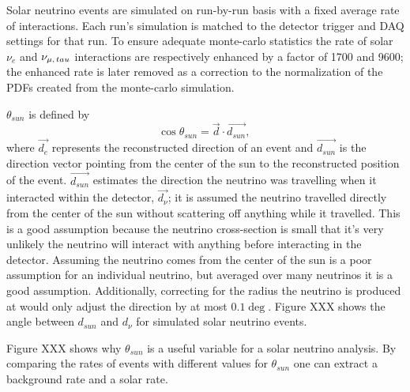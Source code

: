 Solar neutrino events are simulated on run-by-run basis with a fixed average rate
of interactions.
Each run's simulation is matched to the detector trigger and
DAQ settings for that run.
To ensure adequate monte-carlo statistics the rate of solar $\nu_{e}$ and
$\nu_{\mu\text{,\,}tau}$ interactions are respectively enhanced by a factor of
1700 and 9600;
the enhanced rate is later removed as a correction
to the normalization of the PDFs created from the monte-carlo simulation.

$\theta_{sun}$ is defined by
\begin{equation}
\cos\theta_{sun} = \vec{d}\cdot\vec{d_{sun}}\text{, }
\end{equation}
where $\vec{d_{e}}$ represents the reconstructed direction of an event and
$\vec{d_{sun}}$ is the direction vector pointing from the center of the sun to
the reconstructed position of the event.
$\vec{d_{sun}}$ estimates the direction the neutrino was travelling when it interacted
within the detector, $\vec{d_{\nu}}$; it is assumed the neutrino travelled directly
from the center of the sun without scattering off anything while it travelled.
This is a good assumption because the neutrino cross-section is small that it's very
unlikely the neutrino will interact with anything before interacting in the detector.
Assuming the neutrino comes from the center of the sun is a poor assumption for an individual
neutrino, but averaged over many neutrinos it is a good assumption.
Additionally, correcting for the radius the neutrino is produced at would only adjust
the direction by at most $0.1\deg$.
Figure XXX shows the angle between $d_{sun}$ and $d_{\nu}$ for simulated solar neutrino
events.

Figure XXX shows why $\theta_{sun}$ is a useful variable for a solar neutrino analysis.
By comparing the rates of events with different values for $\theta_{sun}$ one can
extract a background rate and a solar rate.







